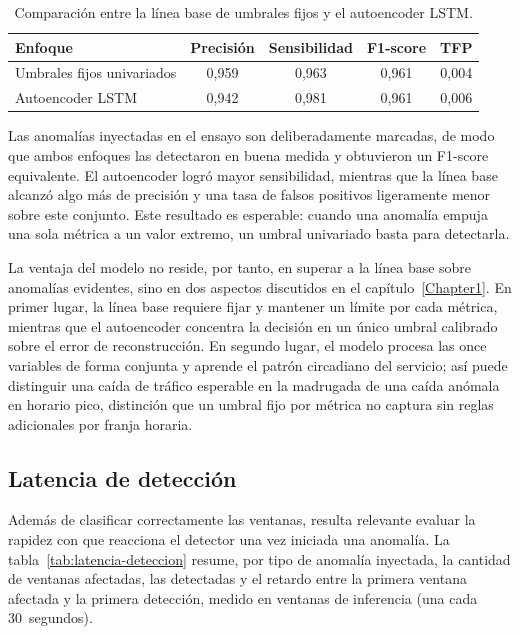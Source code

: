 \begin{table}[h]
\centering
\small
\caption{Comparación entre la línea base de umbrales fijos y el autoencoder LSTM.}
\label{tab:comparacion-baseline}
\begin{tabular}{@{}p{}cccc@{}}
\toprule
\textbf{Enfoque} & \textbf{Precisión} & \textbf{Sensibilidad} & \textbf{F1-score} & \textbf{TFP} \\
\midrule
Umbrales fijos univariados & 0,959 & 0,963 & 0,961 & 0,004 \\
Autoencoder LSTM & 0,942 & 0,981 & 0,961 & 0,006 \\
\bottomrule
\end{tabular}
\end{table}

Las anomalías inyectadas en el ensayo son deliberadamente marcadas, de modo que ambos enfoques las detectaron en buena medida y obtuvieron un F1-score equivalente. El autoencoder logró mayor sensibilidad, mientras que la línea base alcanzó algo más de precisión y una tasa de falsos positivos ligeramente menor sobre este conjunto. Este resultado es esperable: cuando una anomalía empuja una sola métrica a un valor extremo, un umbral univariado basta para detectarla.

La ventaja del modelo no reside, por tanto, en superar a la línea base sobre anomalías evidentes, sino en dos aspectos discutidos en el capítulo~\ref{Chapter1}. En primer lugar, la línea base requiere fijar y mantener un límite por cada métrica, mientras que el autoencoder concentra la decisión en un único umbral calibrado sobre el error de reconstrucción. En segundo lugar, el modelo procesa las once variables de forma conjunta y aprende el patrón circadiano del servicio; así puede distinguir una caída de tráfico esperable en la madrugada de una caída anómala en horario pico, distinción que un umbral fijo por métrica no captura sin reglas adicionales por franja horaria.

\subsection{Latencia de detección}

Además de clasificar correctamente las ventanas, resulta relevante evaluar la rapidez con que reacciona el detector una vez iniciada una anomalía. La tabla~\ref{tab:latencia-deteccion} resume, por tipo de anomalía inyectada, la cantidad de ventanas afectadas, las detectadas y el retardo entre la primera ventana afectada y la primera detección, medido en ventanas de inferencia (una cada 30~segundos).

